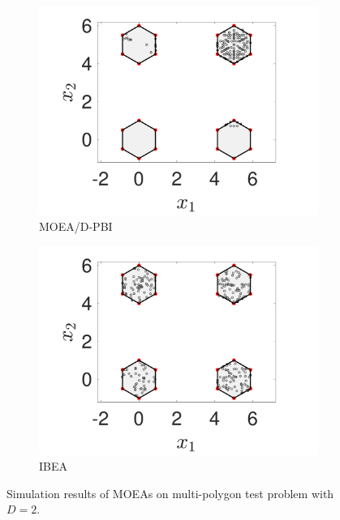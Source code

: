 \documentclass[conference]{IEEEtran}
\begin{document}
\begin{figure}[t!]
    \begin{subfigure}[b]{.24\textwidth}
    \includegraphics[width=\linewidth]{Section5/dim2/PS/MOEAD_PBI}
    \caption{MOEA/D-PBI}
    \end{subfigure}
    \begin{subfigure}[b]{.24\textwidth}
    \includegraphics[width=\linewidth]{Section5/dim2/PS/IBEA}
    \caption{IBEA}
    \end{subfigure}

    \caption{Simulation results of MOEAs on multi-polygon test problem with $D=2$.}
    \label{fig: MOEAs PS dim=2}
\end{figure}
\end{document}
